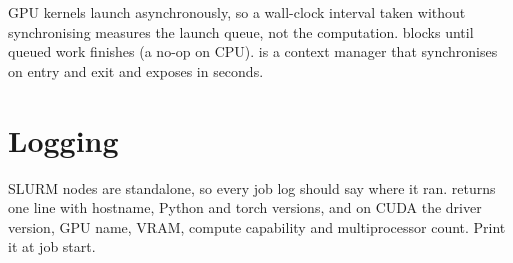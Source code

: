 GPU kernels launch asynchronously, so a wall-clock interval taken without synchronising
measures the launch queue, not the computation.  blocks until
queued work finishes (a no-op on CPU).  is a context manager that
synchronises on entry and exit and exposes  in seconds.


\section{Logging}

SLURM nodes are standalone, so every job log should say where it ran.
 returns one line with hostname, Python and torch versions,
and on CUDA the driver version, GPU name, VRAM, compute capability and multiprocessor
count. Print it at job start.
